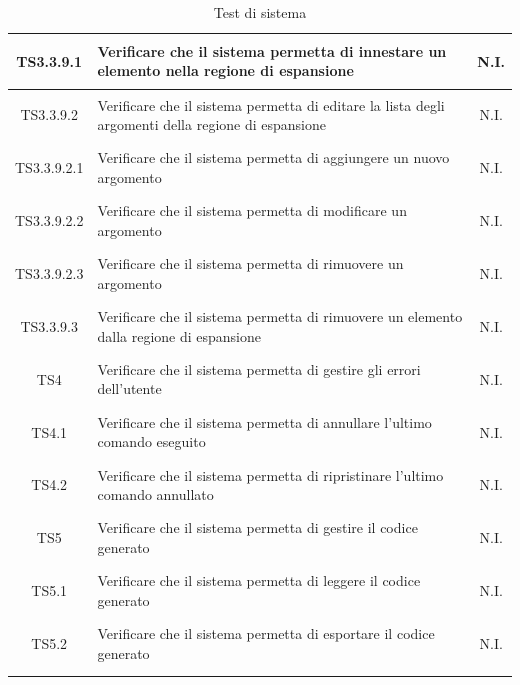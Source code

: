 \documentclass[../PianoDiQualifica.tex]{subfiles}
\begin{document}
\begin{longtable}{|c|>{\centering}p{10cm}|c|}
	\hline
	\hypertarget{TS3.3.9.1}{TS3.3.9.1} & Verificare che il sistema permetta di innestare un elemento nella regione di espansione & N.I. \\
	\hline
	\hypertarget{TS3.3.9.2}{TS3.3.9.2} & Verificare che il sistema permetta di editare la lista degli argomenti della regione di espansione & N.I. \\
	\hline
	\hypertarget{TS3.3.9.2.1}{TS3.3.9.2.1} & Verificare che il sistema permetta di aggiungere un nuovo argomento & N.I. \\
	\hline
	\hypertarget{TS3.3.9.2.2}{TS3.3.9.2.2} & Verificare che il sistema permetta di modificare un argomento & N.I. \\
	\hline
	\hypertarget{TS3.3.9.2.3}{TS3.3.9.2.3} & Verificare che il sistema permetta di rimuovere un argomento & N.I. \\
	\hline
	\hypertarget{TS3.3.9.3}{TS3.3.9.3} & Verificare che il sistema permetta di rimuovere un elemento dalla regione di espansione & N.I. \\
	\hline
	\hypertarget{TS4}{TS4} & Verificare che il sistema permetta di gestire gli errori dell'utente & N.I. \\
	\hline
	\hypertarget{TS4.1}{TS4.1} & Verificare che il sistema permetta di annullare l'ultimo comando eseguito & N.I. \\
	\hline
	\hypertarget{TS4.2}{TS4.2} & Verificare che il sistema permetta di ripristinare l'ultimo comando annullato & N.I. \\
	\hline
	\hypertarget{TS5}{TS5} & Verificare che il sistema permetta di gestire il codice generato & N.I. \\
	\hline
	\hypertarget{TS5.1}{TS5.1} & Verificare che il sistema permetta di leggere il codice generato & N.I. \\
	\hline
	\hypertarget{TS5.2}{TS5.2} & Verificare che il sistema permetta di esportare il codice generato & N.I. \\
	\hline
\caption[Test di sistema]{Test di sistema}
\label{tabella:TestSistema}
\end{longtable}

\newpage
\end{document}
